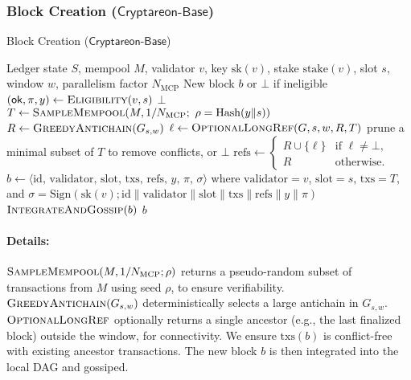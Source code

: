\documentclass[11pt]{article}
\newcommand{\ProjBase}{\ensuremath{\mathsf{Cryptareon\text{-}Base}}\xspace}
\newcommand{\sk}{\ensuremath{\mathrm{sk}}\xspace}
\newcommand{\stake}{\ensuremath{\mathrm{stake}}\xspace}
\newcommand{\id}{\ensuremath{\mathrm{id}}\xspace}
\newcommand{\val}{\ensuremath{\mathrm{validator}}\xspace}
\newcommand{\slot}{\ensuremath{\mathrm{slot}}\xspace}
\newcommand{\txs}{\ensuremath{\mathrm{txs}}\xspace}
\newcommand{\refs}{\ensuremath{\mathrm{refs}}\xspace}
\newcommand{\Anc}{\ensuremath{\mathrm{Anc}}\xspace}
\newcommand{\Conflicts}{\ensuremath{\mathrm{Conflicts}}\xspace}
\newcommand{\Eligibility}{\ensuremath{\textsc{Eligibility}}\xspace}
\newcommand{\Sign}{\ensuremath{\mathrm{Sign}}\xspace}
\newcommand{\Hash}{\ensuremath{\mathrm{Hash}}\xspace}
\newcommand{\GreedyAntichain}{\textsc{GreedyAntichain}\xspace}
\newcommand{\SampleMempool}{\textsc{SampleMempool}\xspace}
\newcommand{\OptionalLongRef}{\textsc{OptionalLongRef}\xspace}
\newcommand{\IntegrateAndGossip}{\textsc{IntegrateAndGossip}\xspace}
\newcommand{\MCP}{\ensuremath{\mathrm{MCP}}\xspace}
\begin{document}
\subsubsection{Block Creation (\ProjBase)}
\begin{algorithm}[H]
\caption{Block Creation (\ProjBase)}
\label{alg:block-creation}
\begin{algorithmic}[1]
\Require Ledger state $S$, mempool $M$, validator $v$, key $\sk(v)$, stake $\stake(v)$, slot $s$, window $w$, parallelism factor $N_{\MCP}$
\Ensure New block $b$ or $\bot$ if ineligible
\State $(\mathsf{ok}, \pi, y) \gets \Eligibility(v,s)$
 \Return $\bot$ \EndIf
\State $T \gets \SampleMempool(M, 1/N_{\MCP};\ \rho = \Hash(y\|s))$
\State $R \gets \GreedyAntichain(G_{s,w})$
\State $\ell \gets \OptionalLongRef(G, s, w, R, T)$
\If{$\Conflicts(T, \Anc^*(R\cup\{\ell\}\setminus\{\bot\}))$}
  \State prune a minimal subset of $T$ to remove conflicts, or \Return $\bot$
\EndIf
\State $\refs \gets
\begin{cases}
R \cup \{\ell\} & \text{if }\ell\neq\bot,\\
R & \text{otherwise.}
\end{cases}$
\State $b \gets \langle \id,\,\val,\,\slot,\,\txs,\,\refs,\,y,\,\pi,\,\sigma\rangle$ where $\val=v$, $\slot=s$, $\txs=T$, and $\sigma=\Sign(\sk(v);\id\|\val\|\slot\|\txs\|\refs\|y\|\pi)$
\State $\IntegrateAndGossip(b)$
\State \Return $b$
\end{algorithmic}
\end{algorithm}

\paragraph{Details:} $\SampleMempool(M,1/N_{\MCP};\rho)$ returns a pseudo-random subset of transactions from $M$ using seed $\rho$, to ensure verifiability. $\GreedyAntichain(G_{s,w})$ deterministically selects a large antichain in $G_{s,w}$. $\OptionalLongRef$ optionally returns a single ancestor (e.g., the last finalized block) outside the window, for connectivity. We ensure $\txs(b)$ is conflict-free with existing ancestor transactions. The new block $b$ is then integrated into the local DAG and gossiped.
\end{document}
